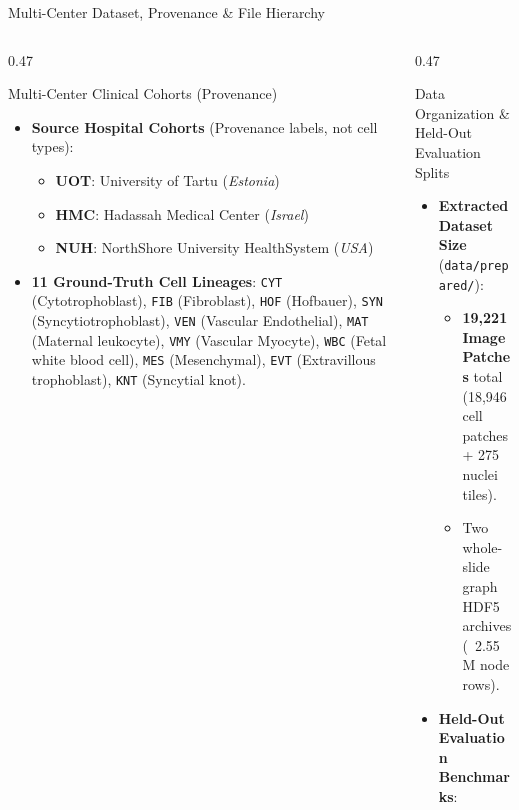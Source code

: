 \documentclass[aspectratio=169, 10pt]{beamer}
\begin{document}
\begin{frame}{Multi-Center Dataset, Provenance \& File Hierarchy}
\begin{columns}[onlytextwidth, t]
  \begin{column}{0.47\textwidth}
    \begin{block}{Multi-Center Clinical Cohorts (Provenance)}
      \parbox[t][4.9cm][t]{\linewidth}{
        \begin{itemize}\footnotesize
          \item \textbf{Source Hospital Cohorts} (Provenance labels, not cell types):
            \begin{itemize}\scriptsize
              \item \textbf{UOT}: University of Tartu (\textit{Estonia})
              \item \textbf{HMC}: Hadassah Medical Center (\textit{Israel})
              \item \textbf{NUH}: NorthShore University HealthSystem (\textit{USA})
            \end{itemize}
          \item \textbf{11 Ground-Truth Cell Lineages}:
            \scriptsize \texttt{CYT} (Cytotrophoblast), \texttt{FIB} (Fibroblast), \texttt{HOF} (Hofbauer), \texttt{SYN} (Syncytiotrophoblast), \texttt{VEN} (Vascular Endothelial), \texttt{MAT} (Maternal leukocyte), \texttt{VMY} (Vascular Myocyte), \texttt{WBC} (Fetal white blood cell), \texttt{MES} (Mesenchymal), \texttt{EVT} (Extravillous trophoblast), \texttt{KNT} (Syncytial knot).
        \end{itemize}
      }
    \end{block}
  \end{column}
  \hfill
  \begin{column}{0.47\textwidth}
    \begin{block}{Data Organization \& Held-Out Evaluation Splits}
      \parbox[t][4.9cm][t]{\linewidth}{
        \begin{itemize}\footnotesize
          \item \textbf{Extracted Dataset Size} (\texttt{data/prepared/}):
            \begin{itemize}\scriptsize
              \item \textbf{19,221 Image Patches} total (18,946 cell patches + 275 nuclei tiles).
              \item Two whole-slide graph HDF5 archives (~2.55M node rows).
            \end{itemize}
          \item \textbf{Held-Out Evaluation Benchmarks}:

\end{itemize}}
\end{block}
\end{column}
\end{columns}
\end{frame}
\end{document}
